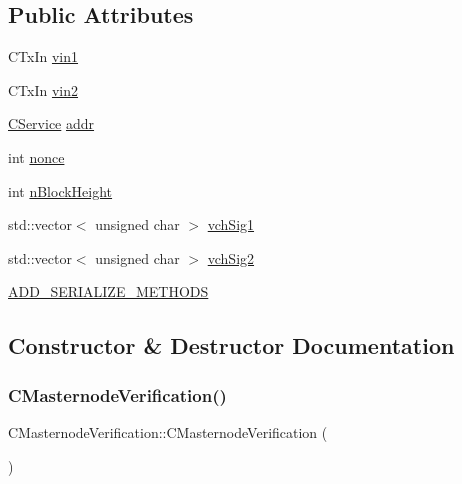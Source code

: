 \subsection*{Public Attributes}
\begin{DoxyCompactItemize}
\item 
C\+Tx\+In \mbox{\hyperlink{class_c_masternode_verification_acc23b066c0499f95f551ef623260a8af}{vin1}}
\item 
C\+Tx\+In \mbox{\hyperlink{class_c_masternode_verification_a0f64c4ac055701ee05946e0a6d3675fa}{vin2}}
\item 
\mbox{\hyperlink{class_c_service}{C\+Service}} \mbox{\hyperlink{class_c_masternode_verification_a3f59cf0f86faf879b98da2e40650c2c1}{addr}}
\item 
int \mbox{\hyperlink{class_c_masternode_verification_a68da56cfde3a649d9df4398584199713}{nonce}}
\item 
int \mbox{\hyperlink{class_c_masternode_verification_abcdce5525c4a618976ef33c01893eced}{n\+Block\+Height}}
\item 
std\+::vector$<$ unsigned char $>$ \mbox{\hyperlink{class_c_masternode_verification_a2faaeb76c5c9e387ebfb1ef8cce37798}{vch\+Sig1}}
\item 
std\+::vector$<$ unsigned char $>$ \mbox{\hyperlink{class_c_masternode_verification_a74ee12a431a4a86c50150c91e766650a}{vch\+Sig2}}
\item 
\mbox{\hyperlink{class_c_masternode_verification_a984864f7623fd45df73dd60f7266ec2e}{A\+D\+D\+\_\+\+S\+E\+R\+I\+A\+L\+I\+Z\+E\+\_\+\+M\+E\+T\+H\+O\+DS}}
\end{DoxyCompactItemize}


\subsection{Constructor \& Destructor Documentation}
\mbox{\label{class_c_masternode_verification_ad1c2e6c5d86261eba390510e2f2ac172}} 
\subsubsection{\texorpdfstring{C\+Masternode\+Verification()}{CMasternodeVerification()}\hspace{0.1cm}{\footnotesize\ttfamily [1/2]}}
{\footnotesize\ttfamily C\+Masternode\+Verification\+::\+C\+Masternode\+Verification (\begin{DoxyParamCaption}{ }\end{DoxyParamCaption})\hspace{0.3cm}{\ttfamily [inline]}}

